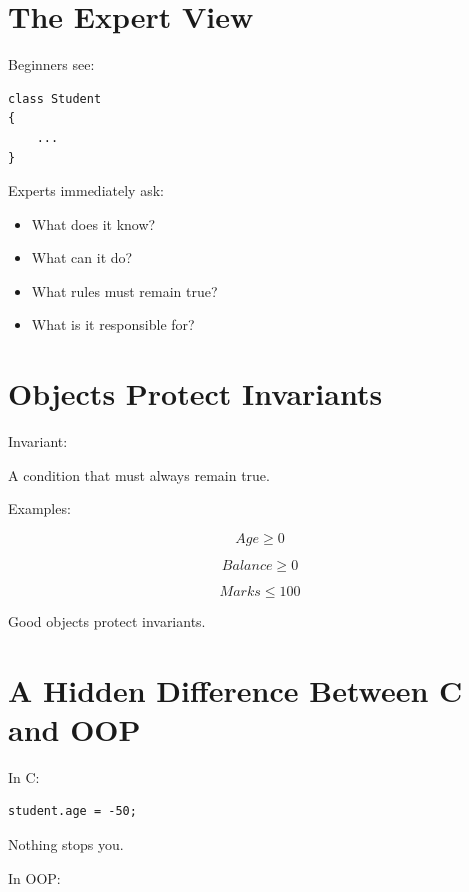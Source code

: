 \documentclass[11pt,a4paper]{book}
\begin{document}
\section{The Expert View}

Beginners see:

\begin{verbatim}
class Student
{
    ...
}
\end{verbatim}

Experts immediately ask:

\begin{itemize}
\item What does it know?
\item What can it do?
\item What rules must remain true?
\item What is it responsible for?
\end{itemize}


\section{Objects Protect Invariants}

\begin{idea}

Invariant:

A condition that must always remain true.

\end{idea}

Examples:

\[
Age \ge 0
\]

\[
Balance \ge 0
\]

\[
Marks \le 100
\]

Good objects protect invariants.


\section{A Hidden Difference Between C and OOP}

In C:\@

\begin{verbatim}
student.age = -50;
\end{verbatim}

Nothing stops you.

In OOP:\@
\end{document}
